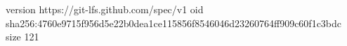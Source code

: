 version https://git-lfs.github.com/spec/v1
oid sha256:4760e9715f956d5e22b0dea1ce115856f8546046d23260764ff909c60f1c3bdc
size 121
